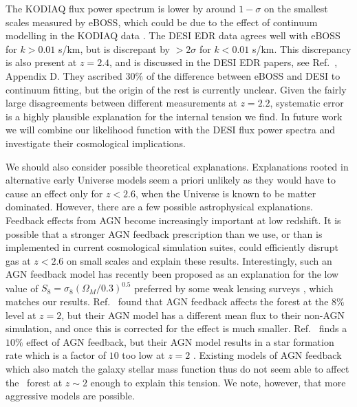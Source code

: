 The KODIAQ flux power spectrum is lower by around $1-\sigma$ on the smallest scales measured by eBOSS, which could be due to the effect of continuum modelling in the KODIAQ data \cite{2022MNRAS.509.2842K}.
The DESI EDR data agrees well with eBOSS for $k > 0.01$ s/km, but is discrepant by $> 2 \sigma$ for $k < 0.01$ s/km.
This discrepancy is also present at $z=2.4$, and is discussed in the DESI EDR papers, see Ref.~\cite{2023arXiv230606311R}, Appendix D.
They ascribed $30\%$ of the difference between eBOSS and DESI to continuum fitting, but the origin of the rest is currently unclear.
Given the fairly large disagreements between different measurements at $z=2.2$, systematic error is a highly plausible explanation for the internal tension we find.
In future work we will combine our likelihood function with the DESI flux power spectra and investigate their cosmological implications.

We should also consider possible theoretical explanations.
Explanations rooted in alternative early Universe models seem a priori unlikely as they would have to cause an effect only for $z < 2.6$, when the Universe is known to be matter dominated. 
However, there are a few possible astrophysical explanations.
Feedback effects from AGN become increasingly important at low redshift.
It is possible that a stronger AGN feedback prescription than we use, or than is implemented in current cosmological simulation suites, could efficiently disrupt gas at $z < 2.6$ on small scales and explain these results.
Interestingly, such an AGN feedback model has recently been proposed as an explanation for the low value of $S_8 = \sigma_8 (\Omega_M/0.3)^{0.5}$ preferred by some weak lensing surveys \cite{2022MNRAS.516.5355A}, which matches our results.
Ref.~\cite{2020MNRAS.495.1825C} found that AGN feedback affects the forest at the $8\%$ level at $z=2$, but their AGN model has a different mean flux to their non-AGN simulation, and once this is corrected for the effect is much smaller. Ref.~\cite{2013MNRAS.429.1734V} finds a $10\%$ effect of AGN feedback, but their AGN model results in a star formation rate which is a factor of $10$ too low at $z=2$ \cite{2010MNRAS.402.1536S}. Existing models of AGN feedback which also match the galaxy stellar mass function thus do not seem able to affect the \Lya~forest at $z \sim 2$ enough to explain this tension. We note, however, that more aggressive models are possible.

